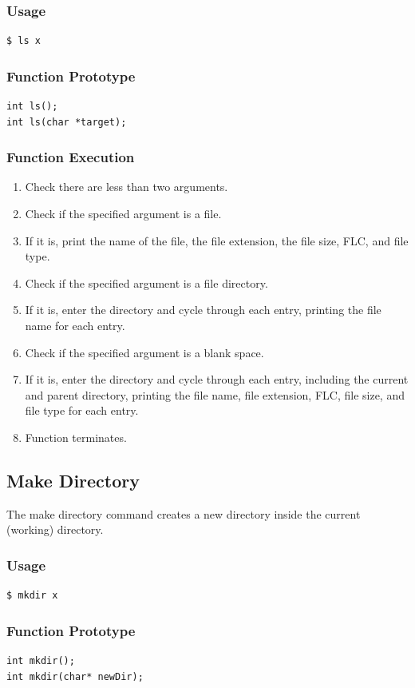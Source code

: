 \documentclass[12pt,letterpaper]{article}
\begin{document}
\subsubsection{Usage}
\begin{verbatim}
$ ls x
\end{verbatim}
\subsubsection{Function Prototype}
\begin{verbatim}
int ls();
int ls(char *target);
\end{verbatim}
\subsubsection{Function Execution}
\begin{enumerate}
\item Check there are less than two arguments.
\item Check if the specified argument is a file.
\item If it is, print the name of the file, the file extension, the file size, FLC, and file type.
\item Check if the specified argument is a file directory.
\item If it is, enter the directory and cycle through each entry, printing the file name for each entry.
\item Check if the specified argument is a blank space.
\item If it is, enter the directory and cycle through each entry, including the current and parent directory, printing the file name, file extension, FLC, file size, and file type for each entry.
\item Function terminates.
\end{enumerate}

\subsection{Make Directory}
The make directory command creates a new directory inside the current (working) directory.
\subsubsection{Usage}
\begin{verbatim}
$ mkdir x
\end{verbatim}
\subsubsection{Function Prototype}
\begin{verbatim}
int mkdir();
int mkdir(char* newDir);
\end{verbatim}
\end{document}
